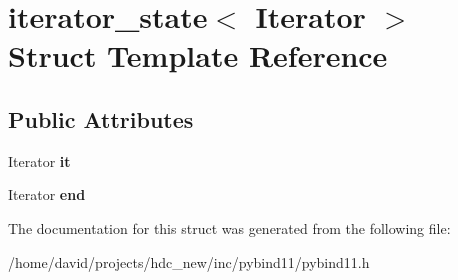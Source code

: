 \hypertarget{structiterator__state}{}\section{iterator\+\_\+state$<$ Iterator $>$ Struct Template Reference}
\label{structiterator__state}
\subsection*{Public Attributes}
\begin{DoxyCompactItemize}
\item 
Iterator {\bfseries it}\hypertarget{structiterator__state_a15a0694917ec5163badcb0ca6caeeabc}{}\label{structiterator__state_a15a0694917ec5163badcb0ca6caeeabc}

\item 
Iterator {\bfseries end}\hypertarget{structiterator__state_ab0cab701d70a30c648955f8ad13385ba}{}\label{structiterator__state_ab0cab701d70a30c648955f8ad13385ba}

\end{DoxyCompactItemize}


The documentation for this struct was generated from the following file\+:\begin{DoxyCompactItemize}
\item 
/home/david/projects/hdc\+\_\+new/inc/pybind11/pybind11.\+h\end{DoxyCompactItemize}
